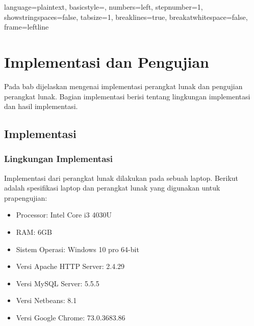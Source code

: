 

\lstset
{ 
    language=plaintext,
    basicstyle=\footnotesize,
    numbers=left,
    stepnumber=1,
    showstringspaces=false,
    tabsize=1,
    breaklines=true,
    breakatwhitespace=false,
    frame=leftline
}

\chapter{Implementasi dan Pengujian}
\label{chap:implementasidanpengujian}
Pada bab dijelaskan mengenai implementasi perangkat lunak dan pengujian perangkat lunak. Bagian implementasi berisi tentang lingkungan implementasi dan hasil implementasi.  

\section{Implementasi}
\label{sec:implementasi}
\subsection{Lingkungan Implementasi}
\label{subsec:lingkunganimplementasi5}
Implementasi dari perangkat lunak dilakukan pada sebuah laptop. Berikut adalah spesifikasi laptop dan perangkat lunak yang digunakan untuk prapengujian:
\begin{itemize}
\item Processor: Intel Core i3 4030U
\item RAM: 6GB
\item Sistem Operasi: Windows 10 pro 64-bit
\item Versi Apache HTTP Server: 2.4.29
\item Versi MySQL Server: 5.5.5
\item Versi Netbeans: 8.1
\item Versi Google Chrome: 73.0.3683.86
\end{itemize}

